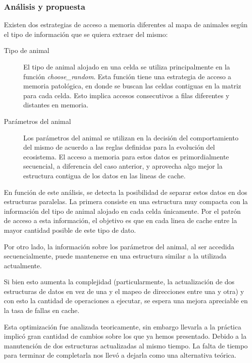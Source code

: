 \documentclass[a4paper,11pt]{article}
\begin{document}
\subsubsection{Análisis y propuesta}

Existen dos estrategias de acceso a memoria diferentes al mapa de animales según el tipo de información que se quiera extraer del mismo:

\begin{description}

    \item[Tipo de animal] El tipo de animal alojado en una celda se utiliza
        principalmente en la función \textit{choose\_random}. Esta función
        tiene una estrategia de acceso a memoria patológica, en donde se buscan
        las celdas contiguas en la matriz para cada celda. Esto implica accesos
        consecutivos a filas diferentes y distantes en memoria.

    \item[Parámetros del animal] Los parámetros del animal se utilizan en la
        decisión del comportamiento del mismo de acuerdo a las reglas definidas
        para la evolución del ecosistema. El acceso a memoria para estos datos
        es primordialmente secuencial, a diferencia del caso anterior, y
        aprovecha algo mejor la estructura contigua de los datos en las lineas
        de cache.

\end{description}

En función de este análisis, se detecta la posibilidad de separar estos datos
en dos estructuras paralelas. La primera consiste en una estructura muy
compacta con la información del tipo de animal alojado en cada celda
únicamente. Por el patrón de acceso a esta información, el objetivo es que en
cada linea de cache entre la mayor cantidad posible de este tipo de dato.

Por otro lado, la información sobre los parámetros del animal, al ser accedida
secuencialmente, puede mantenerse en una estructura similar a la
utilizada actualmente.

Si bien esto aumenta la complejidad (particularmente, la actualización de dos
estructuras de datos en vez de una y el mapeo de direcciones entre una y otra)
y con esto la cantidad de operaciones a ejecutar, se espera una mejora
apreciable en la tasa de fallas en cache.

Esta optimización fue analizada teoricamente, sin embargo llevarla a la
práctica implicó gran cantidad de cambios sobre los que ya hemos presentado.
Debido a la manutención de dos estructuras actualizadas al mismo tiempo. La
falta de tiempo para terminar de completarla nos llevó a dejarla como una
alternativa teórica.
\end{document}

